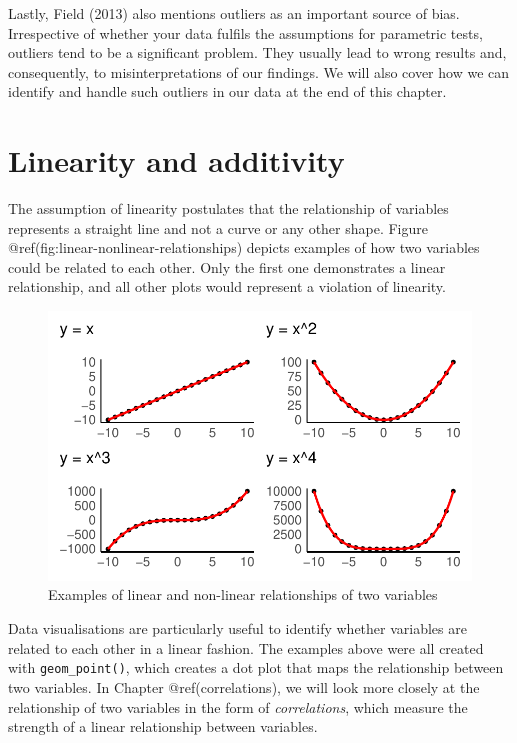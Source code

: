 \documentclass[
  letterpaper,
]{krantz}
\begin{document}
Lastly, Field (2013) also mentions outliers as an important source of
bias. Irrespective of whether your data fulfils the assumptions for
parametric tests, outliers tend to be a significant problem. They
usually lead to wrong results and, consequently, to misinterpretations
of our findings. We will also cover how we can identify and handle such
outliers in our data at the end of this chapter.

\section{Linearity and additivity}\label{sec-additivity-and-linearity}

The assumption of linearity postulates that the relationship of
variables represents a straight line and not a curve or any other shape.
Figure @ref(fig:linear-nonlinear-relationships) depicts examples of how
two variables could be related to each other. Only the first one
demonstrates a linear relationship, and all other plots would represent
a violation of linearity.

\begin{figure}[H]

{\centering \includegraphics{09_sources_of_bias_files/figure-pdf/linear-nonlinear-relationships-1.pdf}

}

\caption{Examples of linear and non-linear relationships of two
variables}

\end{figure}%

Data visualisations are particularly useful to identify whether
variables are related to each other in a linear fashion. The examples
above were all created with \texttt{geom\_point()}, which creates a dot
plot that maps the relationship between two variables. In Chapter
@ref(correlations), we will look more closely at the relationship of two
variables in the form of \emph{correlations}, which measure the strength
of a linear relationship between variables.
\end{document}
